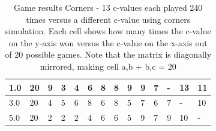 \documentclass[
11pt, %
english, %
singlespacing, %
headsepline, %
]{MastersDoctoralThesis} %
\begin{document}
\begin{appendices}
\begin{table}[H]
\begin{tabular}{|l||l|l|l|l|l|l|l|l|l|l|l|l|l|}
		1.0 & 20  & 9   & 3   & 4   & 6   & 8   & 8   & 9   & 9   & 7   & -   & 13  & 11  \\ \hline
		3.0 & 20  & 4   & 5   & 6   & 8   & 6   & 8   & 5   & 7   & 6   & 7   & -   & 10  \\ \hline
		5.0 & 20  & 2   & 2   & 2   & 4   & 6   & 6   & 5   & 9   & 7   & 9   & 10  & -   \\ \hline
	\end{tabular}
	\caption{Game results Corners - 13 c-values each played 240 times versus a different c-value using corners simulation. Each cell shows how many times the c-value on the y-axis won versus the c-value on the x-axis out of 20 possible games. Note that the matrix is diagonally mirrored, making cell a,b + b,c = 20}
	\label{table:ranking-matrix-corners}
\end{table}


\newcommand{\ifequals}[3]{\ifthenelse{\equal{#1}{#2}}{#3}{}}
\newcommand{\case}[2]{#1 #2} %
\newenvironment{switch}[1]{\renewcommand{\case}{\ifequals{#1}}}{}

\newcommand{\PercentRed}[1]{
	\ifnum #1<9
	1
	\else
	\ifnum #1 < 12
	0.9
	\else
	0.2
	\fi
	\fi
}

\newcommand{\PercentGreen}[1]{
	\ifnum #1<9
	0.2
	\else
	\ifnum #1 < 12
	0.9
	\else
	1
	\fi
	\fi
}

\newcommand{\PercentBlue}[1]{
	\ifnum #1<9
	0.2
	\else
	\ifnum #1 < 12
	0
	\else
	0.2
	\fi
	\fi
}

\newcommand{\ApplyGradient}[1] {
	\IfSubStr{#1}{-}{
		#1
	}{%
	\IfSubStr{#1}{.}{#1}{
		\cellcolor[rgb]{\PercentRed{#1},\PercentGreen{#1}, \PercentBlue{#1}}#1
	}
}%
}




\end{appendices}
\end{document}
